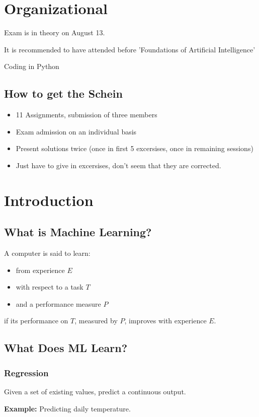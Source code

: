 \documentclass{article}
\begin{document}
\section{Organizational}
Exam is in theory on August 13.

It is recommended to have attended before 'Foundations of Artificial Intelligence'

Coding in Python

\subsection{How to get the Schein}
\begin{itemize}
  \item 11 Assignments, submission of three members
  \item Exam admission on an individual basis
  \item Present solutions twice (once in first 5 excersises, once in remaining sessions)
  \item Just have to give in excersises, don't seem that they are corrected.
\end{itemize}
\section{Introduction}

\subsection{What is Machine Learning?}
A computer is said to learn:
\begin{itemize}
  \item from experience $E$
  \item with respect to a task $T$
  \item and a performance measure $P$
\end{itemize}
if its performance on $T$, measured by $P$, improves with experience $E$.

\subsection{What Does ML Learn?}

\subsubsection{Regression}
Given a set of existing values, predict a continuous output.

\textbf{Example:} Predicting daily temperature.
\end{document}
